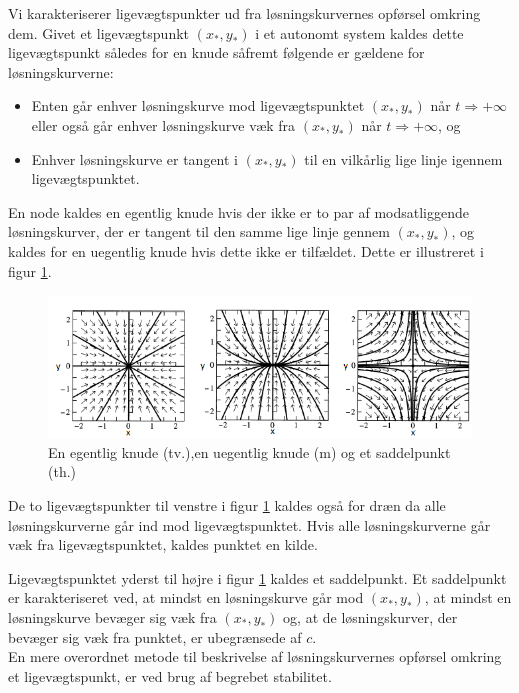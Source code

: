 \hfill \break
Vi karakteriserer ligevægtspunkter ud fra løsningskurvernes opførsel omkring dem. Givet et ligevægtspunkt $(x_*,y_*)$ i et autonomt system kaldes dette ligevægtspunkt således for en knude såfremt følgende er gældene for løsningskurverne:
\begin{itemize}
    \item Enten går enhver løsningskurve mod ligevægtspunktet $(x_*,y_*)$ når $t \Rightarrow + \infty$ eller også går enhver løsningskurve væk fra $(x_*,y_*)$ når $t \Rightarrow + \infty$, og
    \item Enhver løsningskurve er tangent i $(x_*,y_*)$ til en vilkårlig lige linje igennem ligevægtspunktet.  
\end{itemize}
En node kaldes en egentlig knude hvis der ikke er to par af modsatliggende løsningskurver, der er tangent til den samme lige linje gennem $(x_*,y_*)$, og kaldes for en uegentlig knude hvis dette ikke er tilfældet. Dette er illustreret i figur \ref{noder}.
\begin{figure} [H]
    \centering
    \includegraphics[scale=0.8]{Images/noder.png}
    \caption{En egentlig knude (tv.),en uegentlig knude (m) og et saddelpunkt (th.) }
    \label{noder}
\end{figure}

De to ligevægtspunkter til venstre i figur \ref{noder} kaldes også for dræn da alle løsningskurverne går ind mod ligevægtspunktet. Hvis alle løsningskurverne går væk fra ligevægtspunktet, kaldes punktet en kilde.

Ligevægtspunktet yderst til højre i figur \ref{noder} kaldes et saddelpunkt. Et saddelpunkt er karakteriseret ved, at mindst en løsningskurve går mod $(x_*,y_*)$, at mindst en løsningskurve bevæger sig væk fra $(x_*,y_*)$ og, at de løsningskurver, der bevæger sig væk fra punktet, er ubegrænsede af $c$.
\\
En mere overordnet metode til beskrivelse af løsningskurvernes opførsel omkring et ligevægtspunkt, er ved brug af begrebet stabilitet.


